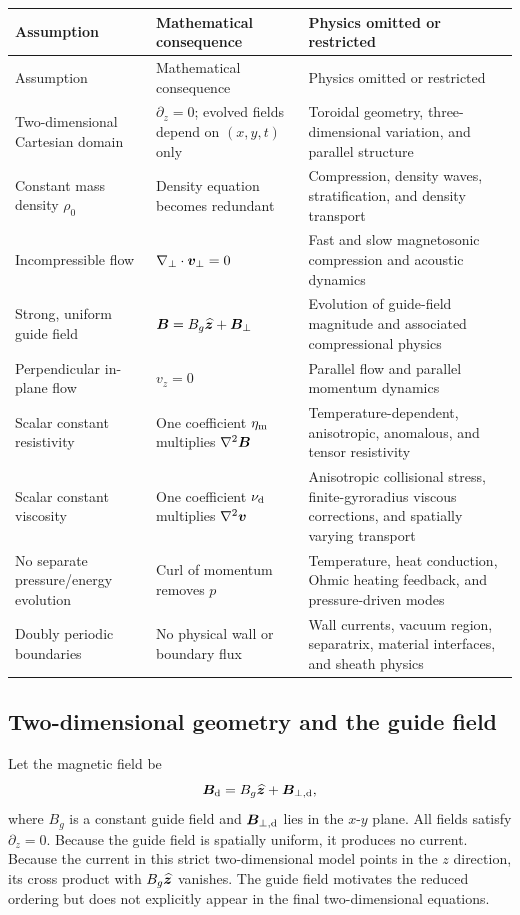 \begin{longtable}{p{}p{}p{}}
\toprule
Assumption & Mathematical consequence & Physics omitted or restricted \\
\midrule
\endfirsthead
\toprule
Assumption & Mathematical consequence & Physics omitted or restricted \\
\midrule
\endhead
Two-dimensional Cartesian domain & $\partial_z=0$; evolved fields depend on $(x,y,t)$ only & Toroidal geometry, three-dimensional variation, and parallel structure \\
Constant mass density $\rho_0$ & Density equation becomes redundant & Compression, density waves, stratification, and density transport \\
Incompressible flow & $\nabla_\perp\cdot\bm{v}_\perp=0$ & Fast and slow magnetosonic compression and acoustic dynamics \\
Strong, uniform guide field & $\bm{B}=B_g\widehat{\bm{z}}+\bm{B}_\perp$ & Evolution of guide-field magnitude and associated compressional physics \\
Perpendicular in-plane flow & $v_z=0$ & Parallel flow and parallel momentum dynamics \\
Scalar constant resistivity & One coefficient $\eta_{\rm m}$ multiplies $\nabla^2\bm{B}$ & Temperature-dependent, anisotropic, anomalous, and tensor resistivity \\
Scalar constant viscosity & One coefficient $\nu_{\rm d}$ multiplies $\nabla^2\bm{v}$ & Anisotropic collisional stress, finite-gyroradius viscous corrections, and spatially varying transport \\
No separate pressure/energy evolution & Curl of momentum removes $p$ & Temperature, heat conduction, Ohmic heating feedback, and pressure-driven modes \\
Doubly periodic boundaries & No physical wall or boundary flux & Wall currents, vacuum region, separatrix, material interfaces, and sheath physics \\
\bottomrule
\end{longtable}

\subsection{Two-dimensional geometry and the guide field}

Let the magnetic field be
\begin{equation}
\bm{B}_{\rm d}=B_g\widehat{\bm{z}}+\bm{B}_{\perp,\rm d},
\end{equation}
where $B_g$ is a constant guide field and $\bm{B}_{\perp,\rm d}$ lies in the $x$-$y$ plane. All fields satisfy $\partial_z=0$. Because the guide field is spatially uniform, it produces no current. Because the current in this strict two-dimensional model points in the $z$ direction, its cross product with $B_g\widehat{\bm{z}}$ vanishes. The guide field motivates the reduced ordering but does not explicitly appear in the final two-dimensional equations.

